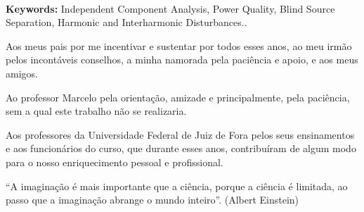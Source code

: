 \documentclass[a4paper,12pt]{monografia}
\theoremstyle{plain}
\theoremstyle{definition}
\theoremstyle{remark}
\begin{document}
 \noindent \\ \textbf{Keywords:} Independent Component Analysis, Power Quality, Blind Source Separation, Harmonic and Interharmonic Disturbances..





 \indent\indent

Aos meus pais por me incentivar e sustentar por todos esses anos, 
ao meu irmão pelos incontáveis conselhos, 
a minha namorada pela paciência e apoio, e aos meus amigos.

Ao professor Marcelo pela orientação, amizade e
principalmente, pela paciência, sem a qual este trabalho n\~ao se
realizaria.

Aos professores da Universidade Federal de Juiz de Fora pelos seus
ensinamentos e aos funcionários do curso, que durante esses anos,
contribuíram de algum modo para o nosso enriquecimento pessoal e
profissional.
\newpage


\begin{epigrafe}
“A imaginação é mais importante que a ciência, porque a ciência é limitada, ao passo que a imaginação abrange o mundo inteiro”. 
\hfill (Albert Einstein)
\end{epigrafe}



 \tableofcontents \thispagestyle{empty} \listoffigures
\thispagestyle{empty} \listoftables \thispagestyle{empty}



\end{document}
